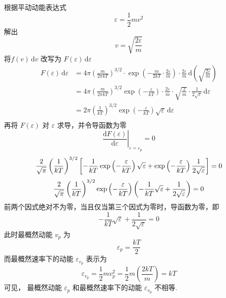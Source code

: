 \begin{solution}
    根据平动动能表达式
    $$
        \varepsilon = \frac{1}{2}mv^2
    $$
    解出
    $$
        v = \sqrt{\dfrac{2\varepsilon}{m}}
    $$
    将$f(v) \,\mathrm{d}v$ 改写为 $F(\varepsilon) \,\mathrm{d}\varepsilon$
    $$
        \begin{aligned}
            F(\varepsilon)\,\mathrm{d}\varepsilon
             & = 4\pi\left(\frac{m}{2\pi kT}\right)^{3/2} \cdot \exp\left(-\frac{m}{2kT} \cdot \frac{2\varepsilon}{m}\right) \cdot \frac{2\varepsilon}{m} \,\mathrm{d}\left(\sqrt{\frac{2\varepsilon}{m}}\right)      \\
             & = 4\pi\left(\frac{m}{2\pi kT}\right)^{3/2} \exp\left(-\frac{\varepsilon}{kT}\right) \cdot \frac{2\varepsilon}{m} \cdot \sqrt{\frac{2}{m}} \cdot \frac{1}{2 \sqrt{\varepsilon}} \,\mathrm{d}\varepsilon \\
             & = 2\pi\left(\frac{1}{kT} \right)^{3/2} \exp\left(-\frac{\varepsilon}{kT}\right) \sqrt{\varepsilon} \,\mathrm{d}\varepsilon                                                                             \\
        \end{aligned}
    $$
    再将 $F(\varepsilon)$ 对 $\varepsilon$ 求导，并令导函数为零
    $$
        \left. \frac{\mathrm{d}F(\varepsilon)}{\mathrm{d}\varepsilon} \right|_{\varepsilon=\varepsilon_p} = 0
    $$
    $$
        \frac{2}{\sqrt{\pi}}\left(\frac{1}{kT} \right)^{3/2} \left[ -\frac{1}{kT}\exp\left(-\frac{\varepsilon}{kT}\right) \sqrt{\varepsilon} + \exp\left(-\frac{\varepsilon}{kT}\right)\frac{1}{2\sqrt{\varepsilon}} \right] = 0 \\
    $$
    $$
        \frac{2}{\sqrt{\pi}}\left( \frac{1}{kT} \right)^{3/2} \exp\left(-\frac{\varepsilon}{kT}\right) \left( -\frac{1}{kT}\sqrt{\varepsilon} + \frac{1}{2\sqrt{\varepsilon}} \right) = 0\\
    $$
    前两个因式绝对不为零，当且仅当第三个因式为零时，导函数为零，即
    $$
        -\frac{1}{kT}\sqrt{\varepsilon} + \frac{1}{2\sqrt{\varepsilon}} = 0
    $$
    此时最概然动能 $v_p$ 为
    $$
        \varepsilon_p = \frac{kT}{2}
    $$
    而最概然速率下的动能 $\varepsilon_{v_p}$ 表示为
    $$
        \varepsilon_{v_p}
        = \frac{1}{2}mv_p^2
        = \frac{1}{2}m\left(\frac{2kT}{m}\right)
        = kT
    $$
    可见， 最概然动能 $\varepsilon_p$ 和最概然速率下的动能 $\varepsilon_{v_p}$ 不相等.
\end{solution}

